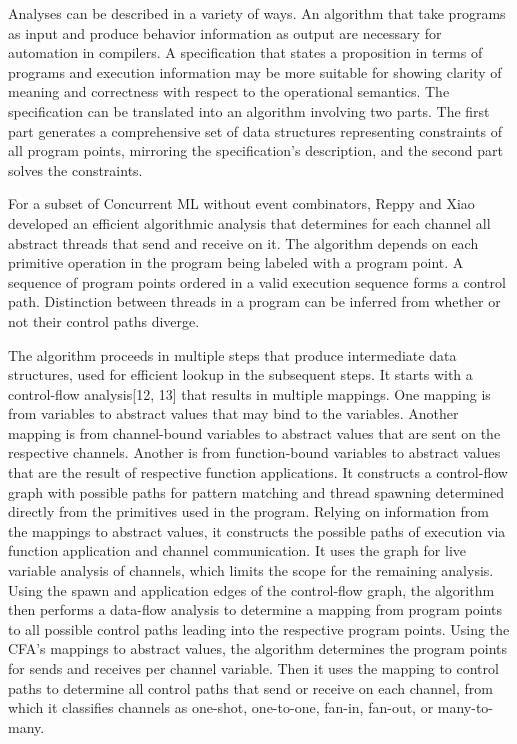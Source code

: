Analyses can be described in a variety of ways.  An algorithm that take programs as input and
produce behavior information as output are necessary for automation in compilers.  A
specification that states a proposition in terms of programs and execution information may be
more suitable for showing clarity of meaning and correctness with respect to the operational
semantics.  The specification can be translated into an algorithm involving two parts.  The
first part generates a comprehensive set of data structures representing constraints of all
program points, mirroring the specification's description, and the second part solves the
constraints.

For a subset of Concurrent ML without event combinators, Reppy and  Xiao developed an
efficient algorithmic analysis that determines for each channel all abstract threads that send
and receive on it.  The algorithm depends on each primitive operation in the program being
labeled with a program point.  A sequence of program points ordered in a valid execution
sequence forms a control path.  Distinction between threads in a program can be inferred from
whether or not their control paths diverge.  

The algorithm proceeds in multiple steps that produce intermediate data structures, used for
efficient lookup in the subsequent steps.  It starts with a control-flow analysis[12, 13] that
results in multiple mappings. One mapping is from variables to abstract values that may bind to
the variables.  Another mapping is from channel-bound variables to abstract values that are
sent on the respective channels.  Another is from function-bound variables to abstract values
that are the result of respective function applications.  It constructs a control-flow graph
with possible paths for pattern matching and thread spawning determined directly from the
primitives used in the program.  Relying on information from the mappings to abstract values,
it constructs the possible paths of execution via function application and channel
communication.  It uses the graph for live variable analysis of channels, which limits the
scope for the remaining analysis.  Using the spawn and application edges of the control-flow
graph, the algorithm then performs a data-flow analysis to determine a mapping from program
points to all possible control paths leading into the respective program points.  Using the
CFA's mappings to abstract values, the algorithm determines the program points for sends and
receives per channel variable.  Then it uses the mapping to control paths to determine all
control paths that send or receive on each channel, from which it classifies channels as
one-shot, one-to-one, fan-in, fan-out, or many-to-many.

